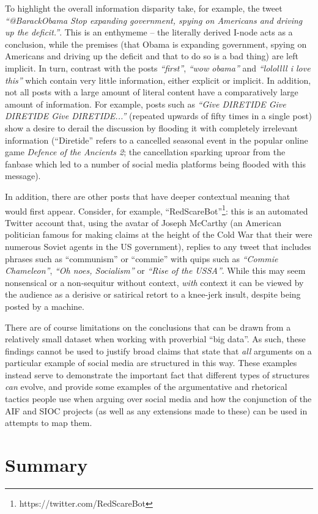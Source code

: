 To highlight the overall information disparity take, for example, the tweet \textit{``@BarackObama Stop expanding government, spying on Americans and driving up the deficit.''}. This is an enthymeme -- the literally derived I-node acts as a conclusion, while the premises (that Obama is expanding government, spying on Americans and driving up the deficit  and that to do so is a bad thing) are left implicit. In turn, contrast with the posts \textit{``first''}, \textit{``wow obama''} and \textit{``lolollll i love this''} which contain very little information, either explicit or implicit. In addition, not all posts with a large amount of literal content have a comparatively large amount of information. For example, posts such as \textit{``Give DIRETIDE Give DIRETIDE Give DIRETIDE...''} (repeated upwards of fifty times in a single post) show a desire to derail the discussion by flooding it with completely irrelevant information (``Diretide'' refers to a cancelled seasonal event in the popular online game \textit{Defence of the Ancients 2}; the cancellation sparking uproar from the fanbase which led to a number of social media platforms being flooded with this message).

In addition, there are other posts that have deeper contextual meaning that would first appear. Consider, for example, ``RedScareBot''\footnote{https://twitter.com/RedScareBot}: this is an automated Twitter account that, using the avatar of Joseph McCarthy (an American politician famous for making claims at the height of the Cold War that their were numerous Soviet agents in the US government), replies to any tweet that includes phrases such as ``communism'' or ``commie'' with quips such as \textit{``Commie Chameleon''}, \textit{``Oh noes, Socialism''} or \textit{``Rise of the USSA''}. While this may seem nonsensical or a non-sequitur without context, \textit{with} context it can be viewed by the audience as a derisive or satirical retort to a knee-jerk insult, despite being posted by a machine.

There are of course limitations on the conclusions that can be drawn from a relatively small dataset when working with proverbial ``big data''. As such, these findings cannot be used to justify broad claims that state that \textit{all} arguments on a particular example of social media are structured in this way. These examples instead serve to demonstrate the important fact that different types of structures \textit{can} evolve, and provide some examples of the argumentative and rhetorical tactics people use when arguing over social media and how the conjunction of the AIF and SIOC projects (as well as any extensions made to these) can be used in attempts to map them.


\section{Summary}
